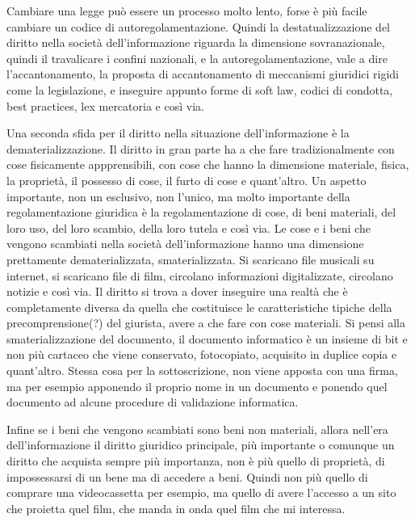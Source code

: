 Cambiare una legge può essere un processo molto lento, forse è più facile cambiare un codice di autoregolamentazione. Quindi la destatualizzazione del diritto nella società dell'informazione riguarda la dimensione sovranazionale, quindi il travalicare i confini nazionali, e la autoregolamentazione, vale a dire l'accantonamento, la proposta di accantonamento di meccanismi giuridici rigidi come la legislazione, e inseguire appunto forme di soft law, codici di condotta, best practices, lex mercatoria e così via. \par

Una seconda sfida per il diritto nella situazione dell'informazione è la dematerializzazione. Il diritto in gran parte ha a che fare tradizionalmente con cose fisicamente appprensibili, con cose che hanno la dimensione materiale, fisica, la proprietà, il possesso di cose, il furto di cose e quant'altro. Un aspetto importante, non un esclusivo, non l'unico, ma molto importante della regolamentazione giuridica è la regolamentazione di cose, di beni materiali, del loro uso, del loro scambio, della loro tutela e così via. Le cose e i beni che vengono scambiati nella società dell'informazione hanno una dimensione prettamente dematerializzata, smaterializzata. Si scaricano file musicali su internet, si scaricano file di film, circolano informazioni digitalizzate, circolano notizie e così via. Il diritto si trova a dover inseguire una realtà che è completamente diversa da quella che costituisce le caratteristiche tipiche della precomprensione(?) del giurista, avere a che fare con cose materiali. Si pensi alla smaterializzazione del documento, il documento informatico è un insieme di bit e non più cartaceo che viene conservato, fotocopiato, acquisito in duplice copia e quant'altro. Stessa cosa per la sottoscrizione, non viene apposta con una firma, ma per esempio apponendo il proprio nome in un documento e ponendo quel documento ad alcune procedure di validazione informatica. \par
Infine se i beni che vengono scambiati sono beni non materiali, allora nell'era dell'informazione il diritto giuridico principale, più importante o comunque un diritto che acquista sempre più importanza, non è più quello di proprietà, di impossessarsi di un bene ma di accedere a beni. Quindi non più quello di comprare una videocassetta per esempio, ma quello di avere l'accesso a un sito che proietta quel film, che manda in onda quel film che mi interessa.\par

